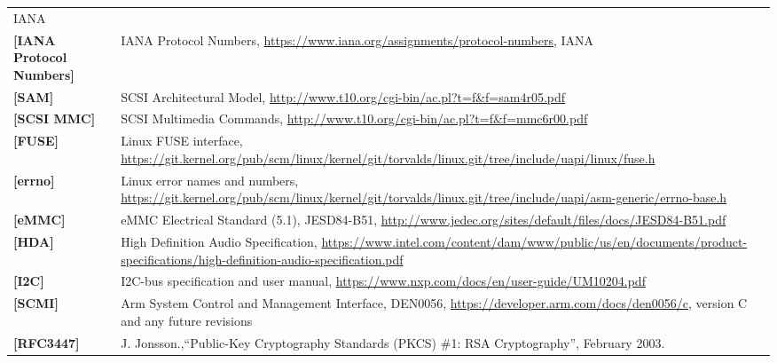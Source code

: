 \begin{longtable}{l p{5in}}
	IANA\\
	\label{intro:IANA Protocol Numbers}\textbf{[IANA Protocol Numbers]} &
	IANA Protocol Numbers,
	\newline\url{https://www.iana.org/assignments/protocol-numbers},
	IANA\\
	\label{intro:SAM}\textbf{[SAM]} &
        SCSI Architectural Model,
        \newline\url{http://www.t10.org/cgi-bin/ac.pl?t=f&f=sam4r05.pdf}\\
	\label{intro:SCSI MMC}\textbf{[SCSI MMC]} &
        SCSI Multimedia Commands,
        \newline\url{http://www.t10.org/cgi-bin/ac.pl?t=f&f=mmc6r00.pdf}\\
	\label{intro:FUSE}\textbf{[FUSE]} &
	Linux FUSE interface,
	\newline\url{https://git.kernel.org/pub/scm/linux/kernel/git/torvalds/linux.git/tree/include/uapi/linux/fuse.h}\\
	\label{intro:errno}\textbf{[errno]} &
	Linux error names and numbers,
	\newline\url{https://git.kernel.org/pub/scm/linux/kernel/git/torvalds/linux.git/tree/include/uapi/asm-generic/errno-base.h}\\
        \label{intro:eMMC}\textbf{[eMMC]} &
        eMMC Electrical Standard (5.1), JESD84-B51,
        \newline\url{http://www.jedec.org/sites/default/files/docs/JESD84-B51.pdf}\\
	\label{intro:HDA}\textbf{[HDA]} &
	High Definition Audio Specification,
	\newline\url{https://www.intel.com/content/dam/www/public/us/en/documents/product-specifications/high-definition-audio-specification.pdf}\\
	\label{intro:I2C}\textbf{[I2C]} &
	I2C-bus specification and user manual,
	\newline\url{https://www.nxp.com/docs/en/user-guide/UM10204.pdf}\\
	\label{intro:SCMI}\textbf{[SCMI]} &
	Arm System Control and Management Interface, DEN0056,
	\newline\url{https://developer.arm.com/docs/den0056/c}, version C and any future revisions\\
	\label{intro:rfc3447}\textbf{[RFC3447]} &
    J. Jonsson.,``Public-Key Cryptography Standards (PKCS) \#1: RSA Cryptography'', February 2003.

\end{longtable}
